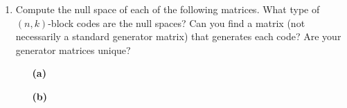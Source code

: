 {\begin{enumerate}
\begin{enumerate}
 \bf\item\rm
$(011010) \; (011100) \; (110111) \; (110000)$
 
 \bf\item\rm
$(011100) \; (011011) \; (111011) \; (100011)$ \\
$(000000) \; (010101) \; (110100) \; (110011)$
 
 \bf\item\rm
$(000000) \; (011100) \; (110101) \; (110001)$
 
 \bf\item\rm
$(0110110) \; (0111100) \; (1110000) \; (1111111)$ \\
$(1001001) \; (1000011) \; (0001111) \; (0000000)$
 
\end{enumerate}
 
 
\bf\item\rm
Compute the null space of each of the following matrices.  What type
of $(n,k)$-block codes are the null spaces? Can you find a matrix (not
necessarily a standard generator matrix) that generates each code?
Are your generator matrices unique?
  
\vspace{3pt}        %
 
\hspace{-7pt}
\begin{minipage}[t]{4.6in}
\noindent
\begin{minipage}[t]{2.25in}
\begin{itemize}
 
 \item[{\bf (a)}]
  
\end{itemize}
\end{minipage} \hfill
\begin{minipage}[t]{2.25in}
\begin{itemize}
 
 \item[{\bf (b)}]
 

\end{itemize}
\end{minipage}
\end{minipage}
\end{enumerate}}
